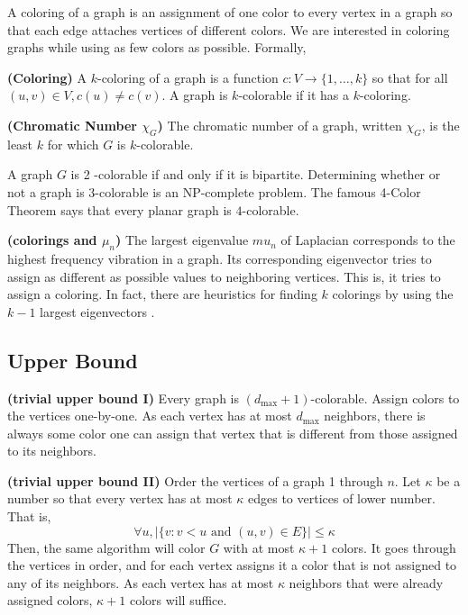\documentclass{article}
\newcommand{\bfs}[1]{\textbf{({#1}) }}
\begin{document}
A coloring of a graph is an assignment of one color to every vertex in a graph so that each edge attaches vertices of different colors. We are interested in coloring graphs while using as few colors as possible. Formally,
\begin{defa}{\bfs{Coloring}}
A $k$-coloring of a graph is a function $c: V \rightarrow\{1, \ldots, k\}$ so that for all $(u, v) \in V, c(u) \neq c(v) .$ A graph is $k$-colorable if it has a $k$-coloring. 
\end{defa}
\begin{defa}{\bfs{Chromatic Number $\chi_{G}$}}
The chromatic number of a graph, written $\chi_{G}$, is the least $k$ for which $G$ is $k$-colorable. 
\end{defa}
\begin{rema}
A graph $G$ is 2 -colorable if and only if it is bipartite. Determining whether or not a graph is $3$-colorable is an NP-complete problem. The famous 4-Color Theorem \cite{appel1989every} says that every planar graph is $4$-colorable.
\end{rema}


\begin{rema}{\bfs{colorings and $\mu_n$}}
The largest eigenvalue $mu_n$ of Laplacian corresponds to the highest frequency vibration in a graph. Its corresponding eigenvector tries to assign as different as possible values to neighboring vertices. This is, it tries to assign a coloring. In fact, there are heuristics for finding $k$ colorings by using the $k-1$ largest eigenvectors \cite{alon1997spectral}.

\end{rema}
\subsection{Upper Bound}
\begin{rema}{\bfs{trivial upper bound I}}
  Every graph is $\left(d_{\max }+1\right)$-colorable. Assign colors to the vertices one-by-one. As each vertex has at most $d_{\max }$ neighbors, there is always some color one can assign that vertex that is different from those assigned to its neighbors. 
\end{rema}
\begin{rema}{\bfs{trivial upper bound II}}
Order the vertices of a graph 1 through $n$. Let $\kappa$ be a number so that every vertex has at most $\kappa$ edges to vertices of lower number. That is,
$$
\forall u, \mid\{v: v<u \text { and }(u, v) \in E\} \mid \leq \kappa
$$
Then, the same algorithm will color $G$ with at most $\kappa+1$ colors. It goes through the vertices in order, and for each vertex assigns it a color that is not assigned to any of its neighbors. As each vertex has at most $\kappa$ neighbors that were already assigned colors, $\kappa+1$ colors will suffice.
\end{rema}
\end{document}
